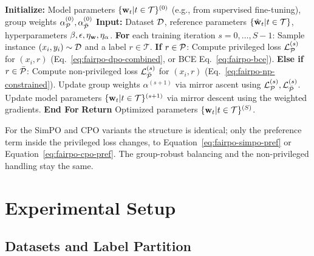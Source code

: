 \begin{algorithm}[t]
	\caption{FairPO Training Overview (DPO-inspired)}
	\label{alg:fairpo-overview}
	\begin{algorithmic}[1]
		\State \textbf{Initialize:} Model parameters $\{\mathbf{w}_t \vert t \in \mathcal{T}\}^{(0)}$ (e.g., from supervised fine-tuning), group weights $\alpha_{\mathcal{P}}^{(0)}, \alpha_{\bar{\mathcal{P}}}^{(0)}$
		\State \textbf{Input:} Dataset $\mathcal{D}$, reference parameters $\{\hat{\mathbf{w}}_t \vert t \in \mathcal{T}\}$, hyperparameters $\beta, \epsilon, \eta_{\mathbf{w}}, \eta_{\alpha}$.
		\State \textbf{For} each training iteration $s = 0, \dots, S-1$:
		\State \hspace{0.5cm} Sample instance $(x_i, y_i) \sim \mathcal{D}$ and a label $r \in \mathcal{T}$.
		\State \hspace{0.5cm} \textbf{If} $r \in \mathcal{P}$:
		\State \hspace{1.0cm} Compute privileged loss $\mathcal{L}_{\mathcal{P}}^{(s)}$ for $(x_i, r)$ (Eq.~\ref{eq:fairpo-dpo-combined}, or BCE Eq.~\ref{eq:fairpo-bce}).
		\State \hspace{0.5cm} \textbf{Else if} $r \in \bar{\mathcal{P}}$:
		\State \hspace{1.0cm} Compute non-privileged loss $\mathcal{L}_{\bar{\mathcal{P}}}^{(s)}$ for $(x_i, r)$ (Eq.~\ref{eq:fairpo-np-constrained}).
		\State \hspace{0.5cm} Update group weights $\alpha^{(s+1)}$ via mirror ascent using $\mathcal{L}_{\mathcal{P}}^{(s)}, \mathcal{L}_{\bar{\mathcal{P}}}^{(s)}$.
		\State \hspace{0.5cm} Update model parameters $\{\mathbf{w}_t \vert t \in \mathcal{T}\}^{(s+1)}$ via mirror descent using the weighted gradients.
		\State \textbf{End For}
		\State \textbf{Return} Optimized parameters $\{\mathbf{w}_t \vert t \in \mathcal{T}\}^{(S)}$.
	\end{algorithmic}
\end{algorithm}

For the SimPO and CPO variants the structure is identical; only the preference term
inside the privileged loss changes, to
Equation~\ref{eq:fairpo-simpo-pref} or Equation~\ref{eq:fairpo-cpo-pref}. The
group-robust balancing and the non-privileged handling stay the same.


\section{Experimental Setup}
\label{sec:fairpo-setup}

\subsection{Datasets and Label Partition}
\label{subsec:fairpo-data}

